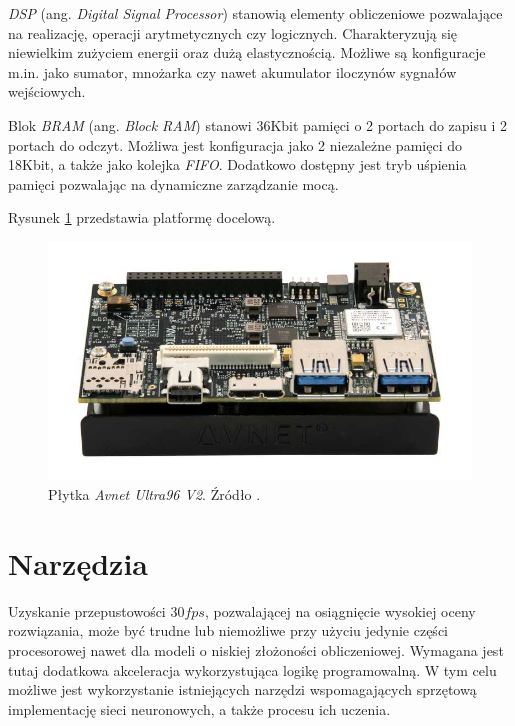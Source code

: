 \emph{DSP} (ang. \emph{Digital Signal Processor}) \cite{dsp} stanowią elementy obliczeniowe pozwalające na realizację, operacji arytmetycznych czy logicznych.
Charakteryzują się niewielkim zużyciem energii oraz dużą elastycznością.
Możliwe są konfiguracje m.in. jako sumator, mnożarka czy nawet akumulator iloczynów sygnałów wejściowych.

Blok \emph{BRAM} (ang. \emph{Block RAM}) \cite{bram} stanowi 36Kbit pamięci o 2 portach do zapisu i 2 portach do odczyt. 
Możliwa jest konfiguracja jako 2 niezależne pamięci do 18Kbit, a także jako kolejka \emph{FIFO}.
Dodatkowo dostępny jest tryb uśpienia pamięci pozwalając na dynamiczne zarządzanie mocą. 

Rysunek \ref{fig:ultra96} przedstawia platformę docelową.

\begin{figure}
    \centering
    \includegraphics[width=\linewidth]{images/ultra96v2.png}
    \caption{Płytka \emph{Avnet Ultra96 V2}. Źródło \cite{avnet_ultra96}.}
    \label{fig:ultra96}
\end{figure}

\section{Narzędzia}
\label{ch:tools}
Uzyskanie przepustowości $30 fps$, pozwalającej na osiągnięcie wysokiej oceny rozwiązania, może być trudne lub niemożliwe  przy użyciu jedynie części procesorowej nawet dla modeli o niskiej złożoności obliczeniowej. 
Wymagana jest tutaj dodatkowa akceleracja wykorzystująca logikę programowalną. 
W tym celu możliwe jest wykorzystanie istniejących narzędzi wspomagających sprzętową implementację sieci neuronowych, a także procesu ich uczenia. 

